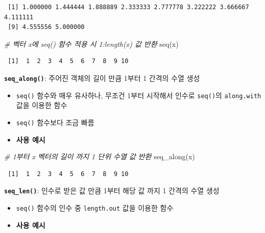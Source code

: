 \documentclass[
  11pt,
]{krantz}
\newenvironment{Shaded}{\begin{snugshade}}{\end{snugshade}}
\newcommand{\CommentTok}[1]{\textcolor[rgb]{0.37,0.37,0.37}{\textit{#1}}}
\newcommand{\FunctionTok}[1]{\textcolor[rgb]{0,0,0}{#1}}
\newcommand{\NormalTok}[1]{#1}
\providecommand{\tightlist}{%
  \setlength{\itemsep}{0pt}\setlength{\parskip}{0pt}}
\begin{document}
\begin{verbatim}
 [1] 1.000000 1.444444 1.888889 2.333333 2.777778 3.222222 3.666667 4.111111
 [9] 4.555556 5.000000
\end{verbatim}

\begin{Shaded}
\begin{Highlighting}[]
\CommentTok{\# 벡터 x에 seq() 함수 적용 시 1:length(x) 값 반환}
\FunctionTok{seq}\NormalTok{(x)}
\end{Highlighting}
\end{Shaded}

\begin{verbatim}
 [1]  1  2  3  4  5  6  7  8  9 10
\end{verbatim}

\normalsize

\textbf{\texttt{seq\_along()}}: 주어진 객체의 길이 만큼 1부터 1 간격의 수열 생성

\begin{itemize}
\tightlist
\item
  \texttt{seq()} 함수와 매우 유사하나, 무조건 1부터 시작해서 인수로 \texttt{seq()}의 \texttt{along.with} 값을 이용한 함수
\item
  \texttt{seq()} 함수보다 조금 빠름
\item
  \textbf{사용 예시}
\end{itemize}

\footnotesize

\begin{Shaded}
\begin{Highlighting}[]
\CommentTok{\# 1부터 x 벡터의 길이 까지 1 단위 수열 값 반환}
\FunctionTok{seq\_along}\NormalTok{(x)}
\end{Highlighting}
\end{Shaded}

\begin{verbatim}
 [1]  1  2  3  4  5  6  7  8  9 10
\end{verbatim}

\normalsize

\textbf{\texttt{seq\_len()}}: 인수로 받은 값 만큼 1부터 해당 값 까지 1 간격의 수열 생성

\begin{itemize}
\tightlist
\item
  \texttt{seq()} 함수의 인수 중 \texttt{length.out} 값을 이용한 함수
\item
  \textbf{사용 예시}
\end{itemize}
\end{document}

